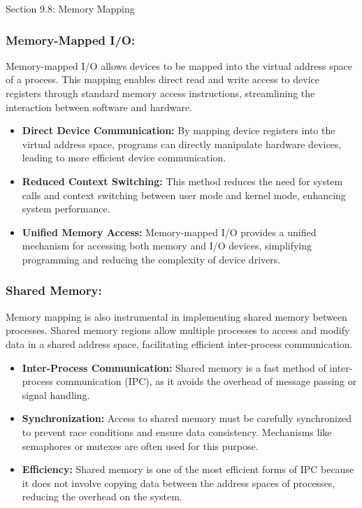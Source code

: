 \begin{notes}{Section 9.8: Memory Mapping}
    \subsubsection*{Memory-Mapped I/O:}
    
    Memory-mapped I/O allows devices to be mapped into the virtual address space of a process. This mapping enables direct read and write access to device registers through standard memory access 
    instructions, streamlining the interaction between software and hardware.
    
    \begin{itemize}
        \item \textbf{Direct Device Communication:} By mapping device registers into the virtual address space, programs can directly manipulate hardware devices, leading to more efficient device communication.
        \item \textbf{Reduced Context Switching:} This method reduces the need for system calls and context switching between user mode and kernel mode, enhancing system performance.
        \item \textbf{Unified Memory Access:} Memory-mapped I/O provides a unified mechanism for accessing both memory and I/O devices, simplifying programming and reducing the complexity of device drivers.
    \end{itemize}
    
    \subsubsection*{Shared Memory:}
    
    Memory mapping is also instrumental in implementing shared memory between processes. Shared memory regions allow multiple processes to access and modify data in a shared address space, facilitating 
    efficient inter-process communication.
    
    \begin{itemize}
        \item \textbf{Inter-Process Communication:} Shared memory is a fast method of inter-process communication (IPC), as it avoids the overhead of message passing or signal handling.
        \item \textbf{Synchronization:} Access to shared memory must be carefully synchronized to prevent race conditions and ensure data consistency. Mechanisms like semaphores or mutexes are often 
        used for this purpose.
        \item \textbf{Efficiency:} Shared memory is one of the most efficient forms of IPC because it does not involve copying data between the address spaces of processes, reducing the overhead on 
        the system.
    \end{itemize}
    

\end{notes}
